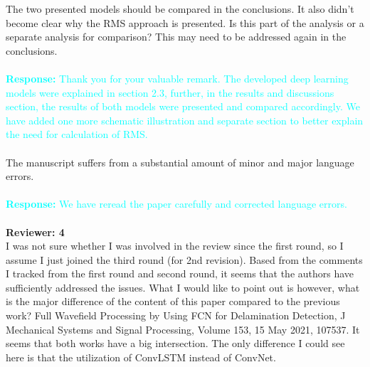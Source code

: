 \documentclass[11pt,a2paper]{report}
\begin{document}
	The two presented models should be compared in the conclusions. 
	It also didn't become clear why the RMS approach is presented. 
	Is this part of the analysis or a separate analysis for comparison? 
	This may need to be addressed again in the conclusions.
		\\ \\
	\textcolor{Cyan}{
		\textbf{Response:}
	Thank you for your valuable remark.
	The developed deep learning models were explained in section 2.3, further, in the results and discussions section, the results of both models were presented and compared accordingly. 
	We have added one more schematic illustration and separate section to better explain the need for calculation of RMS.
    }
	\\ \\	
	The manuscript suffers from a substantial amount of minor and major language errors.
		\\ \\
	\textcolor{Cyan}{
		\textbf{Response:}
		We have reread the paper carefully and corrected language errors.
	}
	\\ \\
	\newpage
	\textbf{Reviewer: 4}  \\
	I was not sure whether I was involved in the review since the first round, so I assume I just joined the third round (for 2nd revision).
	Based from the comments I tracked from the first round and second round, it seems that the authors have sufficiently addressed the issues.
	What I would like to point out is however, what is the major difference of the content of this paper compared to the previous work?
	Full Wavefield Processing by Using FCN for Delamination Detection, J Mechanical Systems and Signal Processing, Volume 153, 15 May 2021, 107537.
	It seems that both works have a big intersection. The only difference I could see here is that the utilization of ConvLSTM instead of ConvNet.	
		\\ \\
\end{document}
